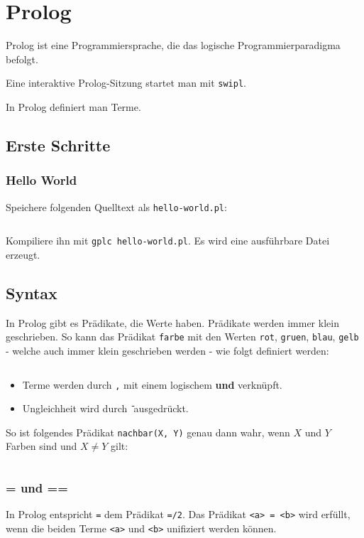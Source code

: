 \chapter{Prolog}

Prolog ist eine Programmiersprache, die das logische Programmierparadigma
befolgt.

Eine interaktive Prolog-Sitzung startet man mit \texttt{swipl}.

In Prolog definiert man Terme.
\section{Erste Schritte}
\subsection{Hello World}
Speichere folgenden Quelltext als \texttt{hello-world.pl}:
\inputminted[linenos, numbersep=5pt, tabsize=4, frame=lines, label=hello-world.hs]{prolog}{scripts/prolog/hello-world.pl}

Kompiliere ihn mit \texttt{gplc hello-world.pl}. Es wird eine
ausführbare Datei erzeugt.

\section{Syntax}
In Prolog gibt es Prädikate, die Werte haben. Prädikate werden immer klein geschrieben.
So kann das Prädikat \texttt{farbe} mit den Werten \texttt{rot}, \texttt{gruen},
\texttt{blau}, \texttt{gelb} - welche auch immer klein geschrieben werden - wie 
folgt definiert werden:

\inputminted[numbersep=5pt, tabsize=4]{prolog}{scripts/prolog/praedikat-farbe.pl}

\begin{itemize}
    \item Terme werden durch \texttt{,} mit einem logischem \textbf{und} verknüpft.
    \item Ungleichheit wird durch \texttt{\=} ausgedrückt.
\end{itemize}

So ist folgendes Prädikat \texttt{nachbar(X, Y)} genau dann wahr, wenn $X$
und $Y$ Farben sind und $X \neq Y$ gilt:

\inputminted[numbersep=5pt, tabsize=4]{prolog}{scripts/prolog/simple-term.pl}

\subsection{= und ==}
In Prolog entspricht \texttt{=} dem Prädikat \texttt{=/2}. Das Prädikat \texttt{<a> = <b>} wird
erfüllt, wenn die beiden Terme \texttt{<a>} und \texttt{<b>} unifiziert werden
können.

